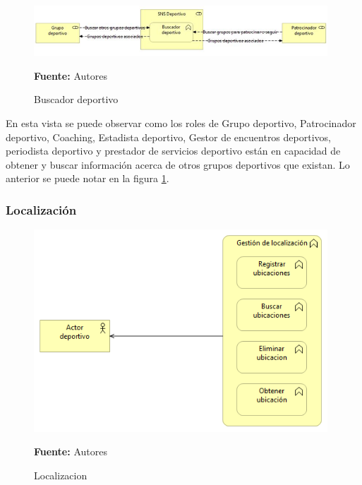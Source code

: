 \begin{figure}[!htb]
  \begin{center}
    \includegraphics[width=11cm]{./imagenes/Archimate/vistas/business_functions/buscadordeportivo.png}
    \caption{Buscador deportivo}
    \label{fig:BF_BuscadorDeportivo}
    \textbf{Fuente:}  Autores \\
  \end{center}
\end{figure}

En esta vista se puede observar como los roles de Grupo deportivo, Patrocinador deportivo, Coaching, Estadista deportivo, Gestor de encuentros deportivos, periodista deportivo y prestador de servicios deportivo están en capacidad de obtener y buscar información acerca de otros grupos deportivos que existan. Lo anterior se puede notar en la figura \ref{fig:BF_BuscadorDeportivo}.

\subsubsection{Localización}

\begin{figure}[!htb]
  \begin{center}
    \includegraphics[width=11cm]{./imagenes/Archimate/vistas/business_functions/localizacion.png}
    \caption{Localizacion}
    \label{fig:BF_localizacion}
    \textbf{Fuente:}  Autores \\
  \end{center}
\end{figure}

